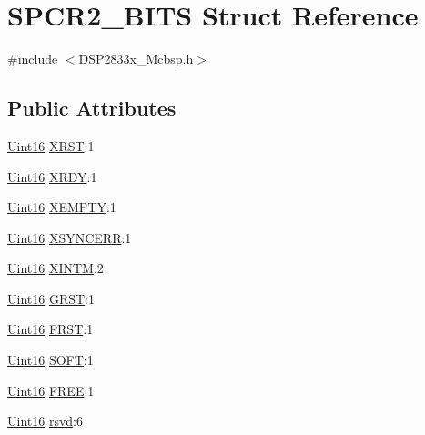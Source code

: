 \hypertarget{struct_s_p_c_r2___b_i_t_s}{}\section{S\+P\+C\+R2\+\_\+\+B\+I\+T\+S Struct Reference}
\label{struct_s_p_c_r2___b_i_t_s}


{\ttfamily \#include $<$D\+S\+P2833x\+\_\+\+Mcbsp.\+h$>$}

\subsection*{Public Attributes}
\begin{DoxyCompactItemize}
\item 
\hyperlink{_d_s_p2833x___device_8h_a59a9f6be4562c327cbfb4f7e8e18f08b}{Uint16} \hyperlink{struct_s_p_c_r2___b_i_t_s_a1d084c3dfd75cd486464ab0d59ea60df}{X\+R\+S\+T}\+:1
\item 
\hyperlink{_d_s_p2833x___device_8h_a59a9f6be4562c327cbfb4f7e8e18f08b}{Uint16} \hyperlink{struct_s_p_c_r2___b_i_t_s_a67dfea553c3b71cbc207e4b9c483ae07}{X\+R\+D\+Y}\+:1
\item 
\hyperlink{_d_s_p2833x___device_8h_a59a9f6be4562c327cbfb4f7e8e18f08b}{Uint16} \hyperlink{struct_s_p_c_r2___b_i_t_s_a24c553aabdae376203edcee37cda237d}{X\+E\+M\+P\+T\+Y}\+:1
\item 
\hyperlink{_d_s_p2833x___device_8h_a59a9f6be4562c327cbfb4f7e8e18f08b}{Uint16} \hyperlink{struct_s_p_c_r2___b_i_t_s_a5e21593f6ae0f59c5116746fa44c6a0c}{X\+S\+Y\+N\+C\+E\+R\+R}\+:1
\item 
\hyperlink{_d_s_p2833x___device_8h_a59a9f6be4562c327cbfb4f7e8e18f08b}{Uint16} \hyperlink{struct_s_p_c_r2___b_i_t_s_a7bba9722509c449e87de81317bf1b8f1}{X\+I\+N\+T\+M}\+:2
\item 
\hyperlink{_d_s_p2833x___device_8h_a59a9f6be4562c327cbfb4f7e8e18f08b}{Uint16} \hyperlink{struct_s_p_c_r2___b_i_t_s_a4d1d107922c016393459a39fec3861a4}{G\+R\+S\+T}\+:1
\item 
\hyperlink{_d_s_p2833x___device_8h_a59a9f6be4562c327cbfb4f7e8e18f08b}{Uint16} \hyperlink{struct_s_p_c_r2___b_i_t_s_a4750ef33b21ff00092d99cd3e6071eb9}{F\+R\+S\+T}\+:1
\item 
\hyperlink{_d_s_p2833x___device_8h_a59a9f6be4562c327cbfb4f7e8e18f08b}{Uint16} \hyperlink{struct_s_p_c_r2___b_i_t_s_a2388d293ba0c89826e845211b8799f27}{S\+O\+F\+T}\+:1
\item 
\hyperlink{_d_s_p2833x___device_8h_a59a9f6be4562c327cbfb4f7e8e18f08b}{Uint16} \hyperlink{struct_s_p_c_r2___b_i_t_s_a5b85d5f6ec89e56380c01c7a49869e7a}{F\+R\+E\+E}\+:1
\item 
\hyperlink{_d_s_p2833x___device_8h_a59a9f6be4562c327cbfb4f7e8e18f08b}{Uint16} \hyperlink{struct_s_p_c_r2___b_i_t_s_a900049951add39b818bcc2df2e19e311}{rsvd}\+:6
\end{DoxyCompactItemize}



